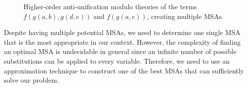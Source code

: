 \begin{figure}[t]
\centering{}
\vspace*{1em}

\centering{}
\caption{Higher-order anti-unification modulo theories of the terms $f(g(a,b), g(d,e))$
and $f(g(a,e))$, creating multiple MSAs.}
  \label{fig:multipleMSA}
\end{figure}


Despite having multiple potential MSAs, we need to determine one single MSA that is the most appropriate in our context. However, the complexity of finding an optimal MSA is undecidable in general \cite{2008:fse:cottrell} since an infinite number of possible substitutions can be applied to every variable. Therefore, we need to use an approximation technique to construct one of the best MSAs that can sufficiently solve our problem.

